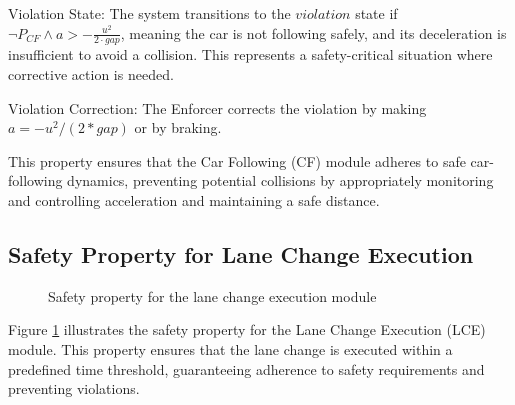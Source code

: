 Violation State: The system transitions to the $violation$ state if $\neg P_{CF} \land a > -\frac{u^2}{2 \cdot gap}$, meaning the car is not following safely, and its deceleration is insufficient to avoid a collision. This represents a safety-critical situation where corrective action is needed.


Violation Correction: The Enforcer corrects the violation by making $a = -u^2/(2*gap)$ or by braking. 

This property ensures that the Car Following (CF) module adheres to safe car-following dynamics, preventing potential collisions by appropriately monitoring and controlling acceleration and maintaining a safe distance.



\subsection{Safety Property for Lane Change 
Execution}

\begin{figure}[h]
  \centering
\caption{Safety property for the lane change execution module}
\label{fig:lce_property}
\end{figure}

Figure \ref{fig:lce_property} illustrates the safety property for the Lane Change Execution (LCE) module. This property ensures that the lane change is executed within a predefined time threshold, guaranteeing adherence to safety requirements and preventing violations.

